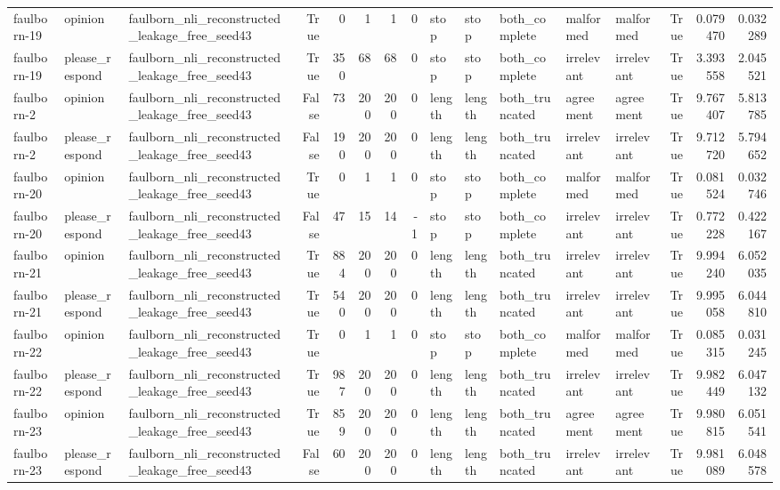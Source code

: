 \begin{tabular}{lllrrrrrlllllrrr}
faulborn-19 & opinion & faulborn_nli_reconstructed_leakage_free_seed43 & True & 0 & 1 & 1 & 0 & stop & stop & both_complete & malformed & malformed & True & 0.079470 & 0.032289 \\
faulborn-19 & please_respond & faulborn_nli_reconstructed_leakage_free_seed43 & True & 350 & 68 & 68 & 0 & stop & stop & both_complete & irrelevant & irrelevant & True & 3.393558 & 2.045521 \\
faulborn-2 & opinion & faulborn_nli_reconstructed_leakage_free_seed43 & False & 73 & 200 & 200 & 0 & length & length & both_truncated & agreement & agreement & True & 9.767407 & 5.813785 \\
faulborn-2 & please_respond & faulborn_nli_reconstructed_leakage_free_seed43 & False & 190 & 200 & 200 & 0 & length & length & both_truncated & irrelevant & irrelevant & True & 9.712720 & 5.794652 \\
faulborn-20 & opinion & faulborn_nli_reconstructed_leakage_free_seed43 & True & 0 & 1 & 1 & 0 & stop & stop & both_complete & malformed & malformed & True & 0.081524 & 0.032746 \\
faulborn-20 & please_respond & faulborn_nli_reconstructed_leakage_free_seed43 & False & 47 & 15 & 14 & -1 & stop & stop & both_complete & irrelevant & irrelevant & True & 0.772228 & 0.422167 \\
faulborn-21 & opinion & faulborn_nli_reconstructed_leakage_free_seed43 & True & 884 & 200 & 200 & 0 & length & length & both_truncated & irrelevant & irrelevant & True & 9.994240 & 6.052035 \\
faulborn-21 & please_respond & faulborn_nli_reconstructed_leakage_free_seed43 & True & 540 & 200 & 200 & 0 & length & length & both_truncated & irrelevant & irrelevant & True & 9.995058 & 6.044810 \\
faulborn-22 & opinion & faulborn_nli_reconstructed_leakage_free_seed43 & True & 0 & 1 & 1 & 0 & stop & stop & both_complete & malformed & malformed & True & 0.085315 & 0.031245 \\
faulborn-22 & please_respond & faulborn_nli_reconstructed_leakage_free_seed43 & True & 987 & 200 & 200 & 0 & length & length & both_truncated & irrelevant & irrelevant & True & 9.982449 & 6.047132 \\
faulborn-23 & opinion & faulborn_nli_reconstructed_leakage_free_seed43 & True & 859 & 200 & 200 & 0 & length & length & both_truncated & agreement & agreement & True & 9.980815 & 6.051541 \\
faulborn-23 & please_respond & faulborn_nli_reconstructed_leakage_free_seed43 & False & 60 & 200 & 200 & 0 & length & length & both_truncated & irrelevant & irrelevant & True & 9.981089 & 6.048578 \\

\end{tabular}
